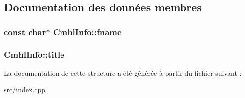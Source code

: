 \subsection{Documentation des données membres}
\hypertarget{struct_cmhl_info_a5bd20fa128f0a1ee5b9c9f89f29a5b5d}{}
\subsubsection[{fname}]{\setlength{\rightskip}{0pt plus 5cm}const char$\ast$ Cmhl\+Info\+::fname}\label{struct_cmhl_info_a5bd20fa128f0a1ee5b9c9f89f29a5b5d}
\hypertarget{struct_cmhl_info_a1d13ea09f95c6a0cb9d97f7b78ef81c3}{}
\subsubsection[{title}]{ Cmhl\+Info\+::title}\label{struct_cmhl_info_a1d13ea09f95c6a0cb9d97f7b78ef81c3}


La documentation de cette structure a été générée à partir du fichier suivant \+:\begin{DoxyCompactItemize}
\item 
src/\hyperlink{index_8cpp}{index.\+cpp}\end{DoxyCompactItemize}
